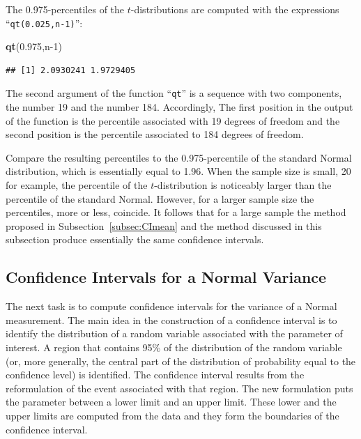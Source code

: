 \documentclass[]{krantz}
\makeatletter
\newenvironment{Shaded}{\begin{snugshade}}{\end{snugshade}}
\newcommand{\DecValTok}[1]{\textcolor[rgb]{0.00,0.00,0.81}{#1}}
\newcommand{\FloatTok}[1]{\textcolor[rgb]{0.00,0.00,0.81}{#1}}
\newcommand{\KeywordTok}[1]{\textcolor[rgb]{0.13,0.29,0.53}{\textbf{#1}}}
\newcommand{\NormalTok}[1]{#1}
\newenvironment{kframe}{%
\medskip{}
\setlength{\fboxsep}{.8em}
 \def\at@end@of@kframe{}%
 \ifinner\ifhmode%
  \def\at@end@of@kframe{\end{minipage}}%
  \begin{minipage}{\columnwidth}%
 \fi\fi%
 \def\FrameCommand##1{\hskip\@totalleftmargin \hskip-\fboxsep
 \colorbox{shadecolor}{##1}\hskip-\fboxsep
     \hskip-\linewidth \hskip-\@totalleftmargin \hskip\columnwidth}%
 \MakeFramed {\advance\hsize-\width
   \@totalleftmargin\z@ \linewidth\hsize
   \@setminipage}}%
 {\par\unskip\endMakeFramed%
 \at@end@of@kframe}
\renewenvironment{Shaded}{\begin{kframe}}{\end{kframe}}
\theoremstyle{definition}
\theoremstyle{definition}
\theoremstyle{definition}
\theoremstyle{remark}
\makeatother
\begin{document}
The 0.975-percentiles of the \(t\)-distributions are computed with the
expressions ``\texttt{qt(0.025,n-1)}'':

\begin{Shaded}
\begin{Highlighting}[]
\KeywordTok{qt}\NormalTok{(}\FloatTok{0.975}\NormalTok{,n}\DecValTok{-1}\NormalTok{)}
\end{Highlighting}
\end{Shaded}

\begin{verbatim}
## [1] 2.0930241 1.9729405
\end{verbatim}

The second argument of the function ``\texttt{qt}'' is a sequence with two
components, the number 19 and the number 184. Accordingly, The first
position in the output of the function is the percentile associated with
19 degrees of freedom and the second position is the percentile
associated to 184 degrees of freedom.

Compare the resulting percentiles to the 0.975-percentile of the
standard Normal distribution, which is essentially equal to 1.96. When
the sample size is small, 20 for example, the percentile of the
\(t\)-distribution is noticeably larger than the percentile of the
standard Normal. However, for a larger sample size the percentiles, more
or less, coincide. It follows that for a large sample the method
proposed in Subsection~\ref{subsec:CImean} and the method
discussed in this subsection produce essentially the same confidence
intervals.

\hypertarget{confidence-intervals-for-a-normal-variance}{%
\subsection{Confidence Intervals for a Normal Variance}\label{confidence-intervals-for-a-normal-variance}}

The next task is to compute confidence intervals for the variance of a
Normal measurement. The main idea in the construction of a confidence
interval is to identify the distribution of a random variable associated
with the parameter of interest. A region that contains 95\% of the
distribution of the random variable (or, more generally, the central
part of the distribution of probability equal to the confidence level)
is identified. The confidence interval results from the reformulation of
the event associated with that region. The new formulation puts the
parameter between a lower limit and an upper limit. These lower and the
upper limits are computed from the data and they form the boundaries of
the confidence interval.
\end{document}
